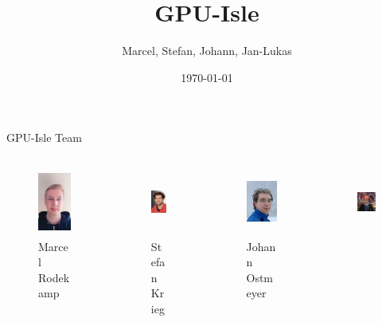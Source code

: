 \documentclass{beamer}
\title{GPU-Isle}
\author{Marcel, Stefan, Johann, Jan-Lukas}
\institute{JSC, JSC, Uni Bonn, ESS}
\date{\today}
\begin{document}
\maketitle

\begin{frame}{GPU-Isle Team}
\begin{columns}
\begin{column}{0.25\textwidth}
\begin{figure}
\includegraphics[width=4em,height=6em]{HackathonSlides/Pictures/Marcel_Rodekamp.jpg}
\caption{Marcel Rodekamp}
\end{figure}
\end{column}
\begin{column}{0.25\textwidth}
\begin{figure}
\includegraphics[width=5em,height=6em]{HackathonSlides/Pictures/krieg_009e.jpg}
\caption{Stefan Krieg}
\end{figure}
\end{column}
\begin{column}{0.25\textwidth}
\begin{figure}
\includegraphics[width=5em,height=6em]{HackathonSlides/Pictures/johann_greiser_kopf.jpg}
\caption{Johann Ostmeyer}
\end{figure}
\end{column}
\begin{column}{0.25\textwidth}
\begin{figure}
\includegraphics[width=6em,height=6em]{HackathonSlides/Pictures/DSC_0762.JPG}

\end{figure}
\end{column}
\end{columns}
\end{frame}
\end{document}
